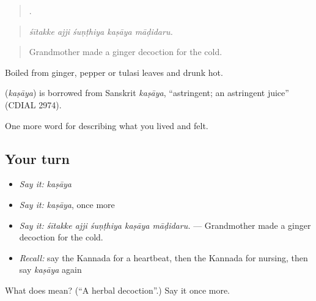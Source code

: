 \begin{quote}
    .
\end{quote}

\begin{quote}
\emph{śītakke ajji śuṇṭhiya kaṣāya māḍidaru.}
\end{quote}

\begin{quote}
Grandmother made a ginger decoction for the cold.
\end{quote}

Boiled from ginger, pepper or tulasi leaves and drunk hot.

\begin{cousinweb}
\textbf{} (\emph{kaṣāya}) is borrowed from Sanskrit \emph{kaṣāya}, \textquotedblleft{}astringent; an astringent juice\textquotedblright{} (CDIAL 2974).
\end{cousinweb}

\begin{grammarlens}[title={What you've built}]
One more word for describing what you lived and felt.
\end{grammarlens}

\subsection*{Your turn}
\begin{itemize}
\raggedright
  \item \emph{Say it:} \emph{kaṣāya}
  \item \emph{Say it:} \emph{kaṣāya}, once more
  \item \emph{Say it:} \emph{śītakke ajji śuṇṭhiya kaṣāya māḍidaru.} — Grandmother made a ginger decoction for the cold.
  \item \emph{Recall:} say the Kannada for a heartbeat, then the Kannada for nursing, then say \emph{kaṣāya} again
\end{itemize}

\begin{tcolorbox}[breakable,colback=teal!4,colframe=teal!35!black,title={Before you move on}]
What does  mean? (\textquotedblleft{}A herbal decoction\textquotedblright{}.) Say it once more.
\end{tcolorbox}
